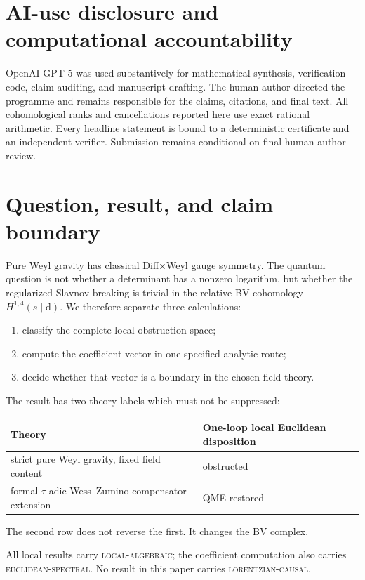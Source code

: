 \documentclass[11pt]{article}
\theoremstyle{definition}
\theoremstyle{remark}
\newcommand{\dd}{\mathrm d}
\begin{document}
\section*{AI-use disclosure and computational accountability}
OpenAI GPT-5 was used substantively for mathematical synthesis, verification
code, claim auditing, and manuscript drafting.  The human author directed the
programme and remains responsible for the claims, citations, and final text.
All cohomological ranks and cancellations reported here use exact rational
arithmetic.  Every headline statement is bound to a deterministic certificate
and an independent verifier.  Submission remains conditional on final human
author review.

\tableofcontents

\section{Question, result, and claim boundary}

Pure Weyl gravity has classical Diff$\times$Weyl gauge symmetry.  The quantum
question is not whether a determinant has a nonzero logarithm, but whether the
regularized Slavnov breaking is trivial in the relative BV cohomology
$H^{1,4}(s\mid\dd)$.  We therefore separate three calculations:
\begin{enumerate}
\item classify the complete local obstruction space;
\item compute the coefficient vector in one specified analytic route;
\item decide whether that vector is a boundary in the chosen field theory.
\end{enumerate}

The result has two theory labels which must not be suppressed:
\begin{center}
\begin{tabularx}{0.94\textwidth}{@{}Y Y@{}}
\toprule
Theory & One-loop local Euclidean disposition\\
\midrule
strict pure Weyl gravity, fixed field content & obstructed\\
formal $\tau$-adic Wess--Zumino compensator extension & QME restored\\
\bottomrule
\end{tabularx}
\end{center}
The second row does not reverse the first.  It changes the BV complex.

All local results carry \textsc{local-algebraic}; the coefficient computation
also carries \textsc{euclidean-spectral}.  No result in this paper carries
\textsc{lorentzian-causal}.
\end{document}
